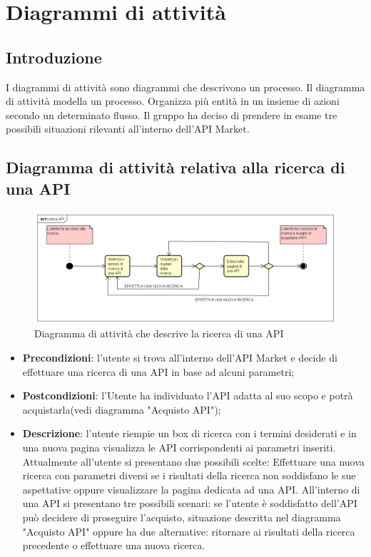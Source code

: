 \newpage
\section{Diagrammi di attività}
\subsection{Introduzione}
I diagrammi di attività sono diagrammi che descrivono un processo. Il diagramma di attività modella un processo. Organizza più entità in un insieme di azioni secondo un determinato flusso.
Il gruppo ha deciso di prendere in esame tre possibili situazioni rilevanti all'interno dell'API Market.

\subsection{Diagramma di attività relativa alla ricerca di una API}
\begin{figure} [H]
	\centering
	\includegraphics[width=1.0\linewidth]{"IMG/ricerca API"}
	\caption{Diagramma di attività che descrive la ricerca di una API}
\end{figure}
\begin{itemize}
	\item \textbf{Precondizioni}: l'utente si trova all'interno dell'API Market e decide di effettuare una ricerca di una API in base ad alcuni parametri;
	\item \textbf{Postcondizioni}: l'Utente ha individuato l'API adatta al suo scopo e potrà acquistarla(vedi diagramma "Acquisto API");
	\item \textbf{Descrizione}: l'utente riempie un box di ricerca con i termini desiderati e in una nuova pagina visualizza le API corrispondenti ai parametri inseriti. Attualmente all'utente si presentano due possibili scelte: Effettuare una nuova ricerca con parametri diversi se i risultati della ricerca non soddisfano le sue aspettative oppure visualizzare la pagina dedicata ad una API. All'interno di una API si presentano tre possibili scenari: se l'utente è soddisfatto dell'API può decidere di proseguire l'acquisto, situazione descritta nel diagramma "Acquisto API" oppure ha due alternative: ritornare ai risultati della ricerca precedente o effettuare una nuova ricerca.
\end{itemize}

